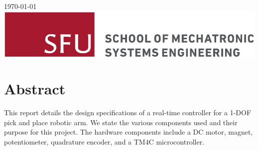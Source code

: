 \documentclass[12pt]{article}
\begin{document}
\begin{titlepage}
{\large \today}\\[2cm] %


\includegraphics[scale=2.0]{MSE-Logo.jpg}\\[1cm] %

\vfill %

\end{titlepage}

\tableofcontents	%




\pagebreak
\setcounter{page}{1}	%
\setlength{\parskip}{1em}

\section{Abstract}
This report details the design specifications of a real-time controller for a 1-DOF pick and place robotic arm. We state the various components used and their purpose for this project. The hardware components include a DC motor, magnet, potentiometer, quadrature encoder, and a TM4C microcontroller. 
 
\end{document}
